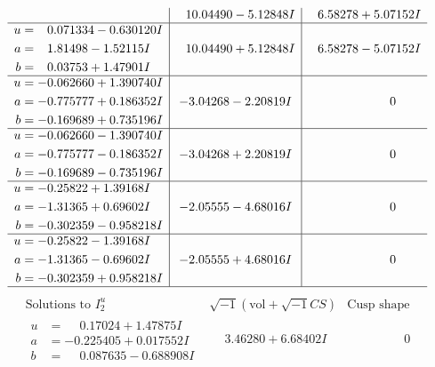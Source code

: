 \documentclass[1p]{elsarticle_modified}
\theoremstyle{definition}
\newcommand{\I}{\sqrt{-1}}
\begin{document}
$$\begin{array}{c|c|c}
 & \phantom{-}10.04490 - 5.12848 I & \phantom{-}6.58278 + 5.07152 I \\ \hline\begin{aligned}
u &= \phantom{-}0.071334 - 0.630120 I \\
a &= \phantom{-}1.81498 - 1.52115 I \\
b &= \phantom{-}0.03753 + 1.47901 I\end{aligned}
 & \phantom{-}10.04490 + 5.12848 I & \phantom{-}6.58278 - 5.07152 I \\ \hline\begin{aligned}
u &= -0.062660 + 1.390740 I \\
a &= -0.775777 + 0.186352 I \\
b &= -0.169689 + 0.735196 I\end{aligned}
 & -3.04268 - 2.20819 I & \phantom{-0.000000 } 0 \\ \hline\begin{aligned}
u &= -0.062660 - 1.390740 I \\
a &= -0.775777 - 0.186352 I \\
b &= -0.169689 - 0.735196 I\end{aligned}
 & -3.04268 + 2.20819 I & \phantom{-0.000000 } 0 \\ \hline\begin{aligned}
u &= -0.25822 + 1.39168 I \\
a &= -1.31365 + 0.69602 I \\
b &= -0.302359 - 0.958218 I\end{aligned}
 & -2.05555 - 4.68016 I & \phantom{-0.000000 } 0 \\ \hline\begin{aligned}
u &= -0.25822 - 1.39168 I \\
a &= -1.31365 - 0.69602 I \\
b &= -0.302359 + 0.958218 I\end{aligned}
 & -2.05555 + 4.68016 I & \phantom{-0.000000 } 0\\
 \hline 
 \end{array}$$\newpage$$\begin{array}{c|c|c}  
\text{Solutions to }I^u_{2}& \I (\text{vol} + \sqrt{-1}CS) & \text{Cusp shape}\\
 \hline 
\begin{aligned}
u &= \phantom{-}0.17024 + 1.47875 I \\
a &= -0.225405 + 0.017552 I \\
b &= \phantom{-}0.087635 - 0.688908 I\end{aligned}
 & \phantom{-}3.46280 + 6.68402 I & \phantom{-0.000000 } 0 \\ \hline\begin{aligned}

\end{aligned}
\end{array}$$
\end{document}
